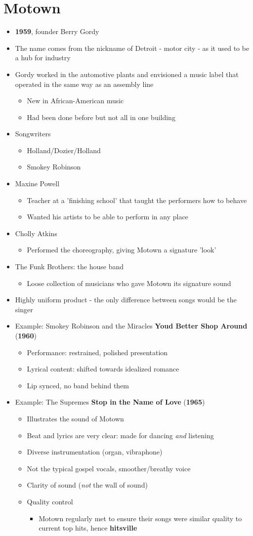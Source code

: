 \documentclass[11pt]{report}
\newcommand{\imp}[1]{\textbf{#1}}
\newcommand{\idate}[2]{\textcolor{blue!50}{\imp{#1}}\label{date:#2}}
\newcommand{\bl}{\begin{itemize}}
\newcommand{\kl}{\end{itemize}}
\newcommand{\song}[2]{\textcolor{red!70}{\textbf{#1}} (\idate{#2}{#1})}
\begin{document}
\section{Motown}
\begin{itemize}
	\item \idate{1959}{motown-founded}, founder Berry Gordy
	\item The name comes from the nickname of Detroit - motor city - as it used to be a hub for industry
	\item Gordy worked in the automotive plants and envisioned a music label that operated in the same way as an assembly line
	\bl
		\item New in African-American music
		\item Had been done before but not all in one building
	\kl
	\item Songwriters
	\bl
		\item Holland/Dozier/Holland
		\item Smokey Robinson
	\kl
	\item Maxine Powell
	\bl
		\item Teacher at a 'finishing school' that taught the performers how to behave
		\item Wanted his artists to be able to perform in any place
	\kl
	\item Cholly Atkins
	\bl
		\item Performed the choreography, giving Motown a signature 'look'
	\kl
	\item The Funk Brothers: the house band
	\bl
		\item Loose collection of musicians who gave Motown its signature sound
	\kl
	\item Highly uniform product - the only difference between songs would be the singer
	\item Example: Smokey Robinson and the Miracles \song{Youd Better Shop Around}{1960}
	\bl
		\item Performance: restrained, polished presentation
		\item Lyrical content: shifted towards idealized romance
		\item Lip synced, no band behind them
	\kl
	\item Example: The Supremes \song{Stop in the Name of Love}{1965}
	\bl
		\item Illustrates the sound of Motown
		\item Beat and lyrics are very clear: made for dancing \textit{and} listening
		\item Diverse instrumentation (organ, vibraphone)
		\item Not the typical gospel vocals, smoother/breathy voice
		\item Clarity of sound (\textit{not} the wall of sound)
		\item Quality control
		\bl
			\item Motown regularly met to ensure their songs were similar quality to current top hits, hence \textbf{hitsville}
		\kl
	\kl
\end{itemize}
\end{document}
